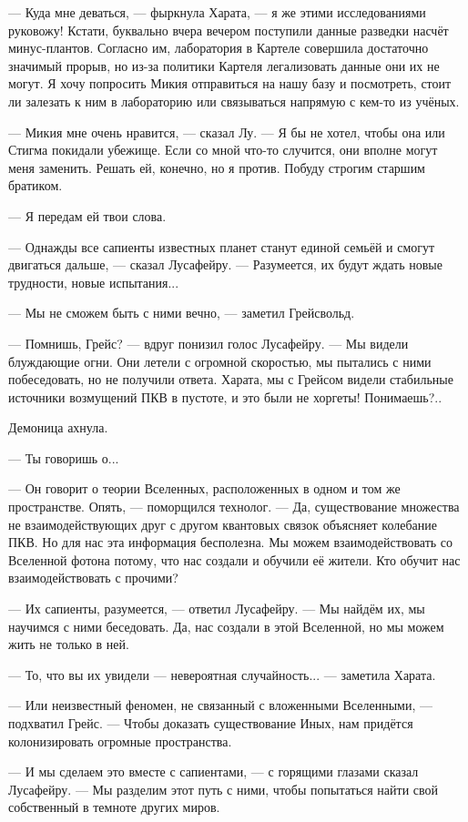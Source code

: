 --- Куда мне деваться, --- фыркнула Харата, --- я же этими исследованиями руковожу!
Кстати, буквально вчера вечером поступили данные разведки насчёт минус-плантов.
Согласно им, лаборатория в Картеле совершила достаточно значимый прорыв, но из-за политики Картеля легализовать данные они их не могут.
Я хочу попросить Микия отправиться на нашу базу и посмотреть, стоит ли залезать к ним в лабораторию или связываться напрямую с кем-то из учёных.

--- Микия мне очень нравится, --- сказал Лу.
--- Я бы не хотел, чтобы она или Стигма покидали убежище.
Если со мной что-то случится, они вполне могут меня заменить.
Решать ей, конечно, но я против.
Побуду строгим старшим братиком.

--- Я передам ей твои слова.

--- Однажды все сапиенты известных планет станут единой семьёй и смогут двигаться дальше, --- сказал Лусафейру.
--- Разумеется, их будут ждать новые трудности, новые испытания...

--- Мы не сможем быть с ними вечно, --- заметил Грейсвольд.

--- Помнишь, Грейс? --- вдруг понизил голос Лусафейру.
--- Мы видели блуждающие огни.
Они летели с огромной скоростью, мы пытались с ними побеседовать, но не получили ответа.
Харата, мы с Грейсом видели стабильные источники возмущений ПКВ в пустоте, и это были не хоргеты!
Понимаешь?..

Демоница ахнула.

--- Ты говоришь о...

--- Он говорит о теории Вселенных, расположенных в одном и том же пространстве.
Опять, --- поморщился технолог.
--- Да, существование множества не взаимодействующих друг с другом квантовых связок объясняет колебание ПКВ.
Но для нас эта информация бесполезна.
Мы можем взаимодействовать со Вселенной фотона потому, что нас создали и обучили её жители.
Кто обучит нас взаимодействовать с прочими?

--- Их сапиенты, разумеется, --- ответил Лусафейру.
--- Мы найдём их, мы научимся с ними беседовать.
Да, нас создали в этой Вселенной, но мы можем жить не только в ней.

--- То, что вы их увидели --- невероятная случайность... --- заметила Харата.

--- Или неизвестный феномен, не связанный с вложенными Вселенными, --- подхватил Грейс.
--- Чтобы доказать существование Иных, нам придётся колонизировать огромные пространства.

--- И мы сделаем это вместе с сапиентами, --- с горящими глазами сказал Лусафейру.
--- Мы разделим этот путь с ними, чтобы попытаться найти свой собственный в темноте других миров.

